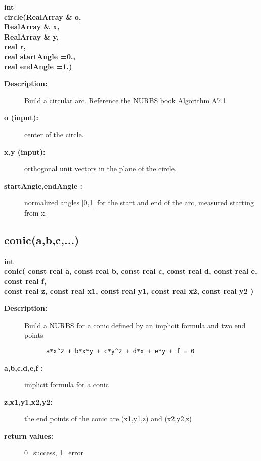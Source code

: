 \begin{flushleft} \textbf{%
int  \\ 
\settowidth{\NurbsMappingIncludeArgIndent}{circle(}%
circle(RealArray \& o,\\ 
\hspace{\NurbsMappingIncludeArgIndent}RealArray \& x, \\ 
\hspace{\NurbsMappingIncludeArgIndent}RealArray \& y, \\ 
\hspace{\NurbsMappingIncludeArgIndent}real r,\\ 
\hspace{\NurbsMappingIncludeArgIndent}real startAngle  =0.,\\ 
\hspace{\NurbsMappingIncludeArgIndent}real endAngle  =1.)
}\end{flushleft}
\begin{description}
\item[{\bf Description:}] 
   Build a circular arc. Reference the NURBS book Algorithm A7.1
\item[{\bf o (input):}]  center of the circle.
\item[{\bf x,y (input):}]  orthogonal unit vectors in the plane of the circle.
\item[{\bf startAngle,endAngle :}]  normalized angles [0,1] for the start and end of
  the arc, measured starting from x.

\end{description}
\subsection{conic(a,b,c,...)}
 
\begin{flushleft} \textbf{%
int  \\ 
\settowidth{\NurbsMappingIncludeArgIndent}{conic(}%
conic( const real a, const real b, const real c, const real d, const real e, const real f, \\ 
\hspace{\NurbsMappingIncludeArgIndent}const real z, const real x1, const real y1, const real x2, const real y2 )
}\end{flushleft}
\begin{description}
\item[{\bf Description:}] 
 Build a NURBS for a conic defined by an implicit formula and two end points
 \begin{verbatim}
      a*x^2 + b*x*y + c*y^2 + d*x + e*y + f = 0
 \end{verbatim}

\item[{\bf a,b,c,d,e,f :}]  implicit formula for a conic
\item[{\bf z,x1,y1,x2,y2:}]  the end points of the conic are (x1,y1,z) and (x2,y2,z)

\item[{\bf return values:}]  0=success, 1=error

\end{description}
